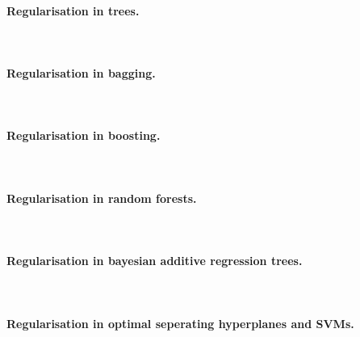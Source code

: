 \documentclass[12pt]{article}
\begin{document}
\paragraph{Regularisation in trees.}~
\newline~


\paragraph{Regularisation in bagging.}~
\newline~

\paragraph{Regularisation in boosting.}~
\newline~

\paragraph{Regularisation in random forests.}~
\newline~

\paragraph{Regularisation in bayesian additive regression trees.}~
\newline~

\paragraph{Regularisation in optimal seperating hyperplanes and SVMs.}~
\newline~
\end{document}
